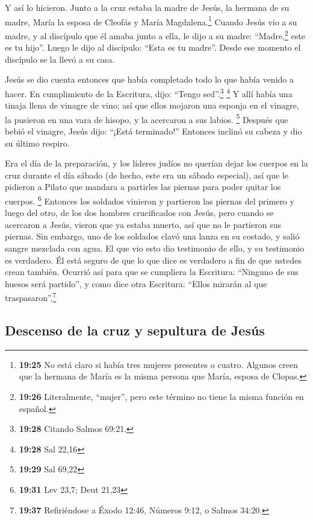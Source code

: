  Y así lo hicieron. Junto a la cruz estaba la madre de
Jesús, la hermana de su madre, María la esposa de Cleofás y María
Magdalena.\footnote{\textbf{19:25} No está claro si había tres mujeres
  presentes o cuatro. Algunos creen que la hermana de María es la misma
  persona que María, esposa de Clopas.}  Cuando Jesús vio
a su madre, y al discípulo que él amaba junto a ella, le dijo a su
madre: ``Madre,\footnote{\textbf{19:26} Literalmente, ``mujer'', pero
  este término no tiene la misma función en español.} este es tu hijo''.
 Luego le dijo al discípulo: ``Esta es tu madre''. Desde
ese momento el discípulo se la llevó a su casa.

 Jesús se dio cuenta entonces que había completado todo
lo que había venido a hacer. En cumplimiento de la Escritura, dijo:
``Tengo sed''.\footnote{\textbf{19:28} Citando Salmos 69:21.}
\footnote{\textbf{19:28} Sal 22,16}  Y allí había una
tinaja llena de vinagre de vino; así que ellos mojaron una esponja en el
vinagre, la pusieron en una vara de hisopo, y la acercaron a sus labios.
\footnote{\textbf{19:29} Sal 69,22}  Después que bebió el
vinagre, Jesús dijo: ``¡Está terminado!'' Entonces inclinó su cabeza y
dio su último respiro.

 Era el día de la preparación, y los líderes judíos no
querían dejar los cuerpos en la cruz durante el día sábado (de hecho,
este era un sábado especial), así que le pidieron a Pilato que mandara a
partirles las piernas para poder quitar los cuerpos. \footnote{\textbf{19:31}
  Lev 23,7; Deut 21,23}  Entonces los soldados vinieron y
partieron las piernas del primero y luego del otro, de los dos hombres
crucificados con Jesús,  pero cuando se acercaron a
Jesús, vieron que ya estaba muerto, así que no le partieron sus piernas.
 Sin embargo, uno de los soldados clavó una lanza en su
costado, y salió sangre mezclada con agua.  El que vio
esto dio testimonio de ello, y su testimonio es verdadero. Él está
seguro de que lo que dice es verdadero a fin de que ustedes crean
también.  Ocurrió así para que se cumpliera la Escritura:
``Ninguno de sus huesos será partido'',  y como dice otra
Escritura: ``Ellos mirarán al que traspasaron''.\footnote{\textbf{19:37}
  Refiriéndose a Éxodo 12:46, Números 9:12, o Salmos 34:20.}

\hypertarget{descenso-de-la-cruz-y-sepultura-de-jesuxfas}{%
\subsection{Descenso de la cruz y sepultura de
Jesús}\label{descenso-de-la-cruz-y-sepultura-de-jesuxfas}}

